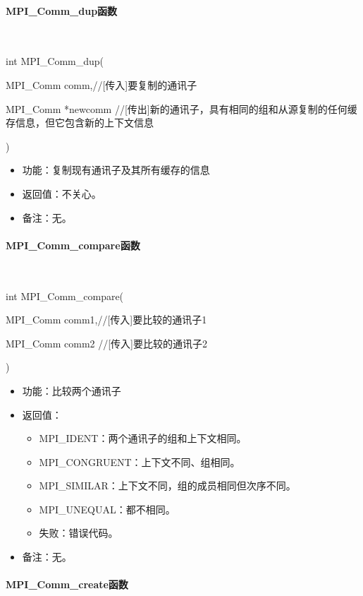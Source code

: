 \documentclass[UTF8]{article}%
\begin{document}
\paragraph{MPI\_Comm\_dup函数}~{}

int MPI\_Comm\_dup(
    
    \qquad MPI\_Comm comm,//[传入]要复制的通讯子

    \qquad MPI\_Comm *newcomm //[传出]新的通讯子，具有相同的组和从源复制的任何缓存信息，但它包含新的上下文信息
    
    )

\begin{itemize}
    \item 功能：复制现有通讯子及其所有缓存的信息
    \item 返回值：不关心。
    \item 备注：无。
\end{itemize}

\paragraph{MPI\_Comm\_compare函数}~{}

int MPI\_Comm\_compare(
    
    \qquad MPI\_Comm comm1,//[传入]要比较的通讯子1

    \qquad MPI\_Comm comm2 //[传入]要比较的通讯子2
    
    )

\begin{itemize}
    \item 功能：比较两个通讯子
    \item 返回值：
    
    {
        \begin{itemize}
            \item MPI\_IDENT：两个通讯子的组和上下文相同。
            \item MPI\_CONGRUENT：上下文不同、组相同。
            \item MPI\_SIMILAR：上下文不同，组的成员相同但次序不同。
            \item MPI\_UNEQUAL：都不相同。
            \item 失败：错误代码。    
        \end{itemize}
    }
    \item 备注：无。
\end{itemize}


\paragraph{MPI\_Comm\_create函数}~{}
\end{document}
